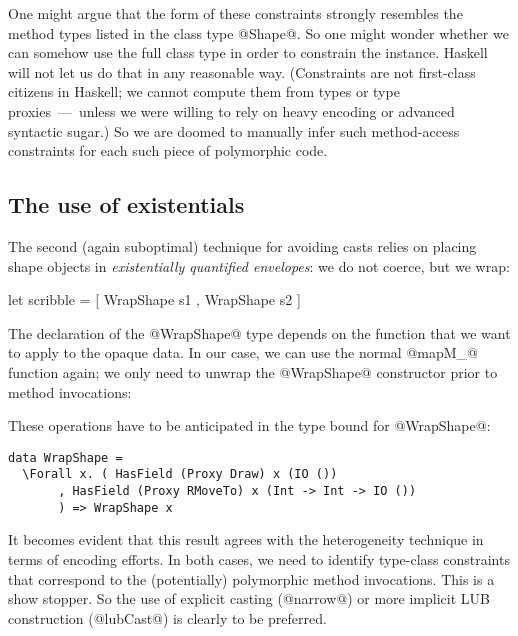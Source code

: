 One might argue that the form of these constraints strongly resembles
the method types listed in the class type @Shape@. So one might wonder
whether we can somehow use the full class type in order to constrain
the instance.  Haskell will not let us do that in any reasonable
way. (Constraints are not first-class citizens in Haskell; we cannot
compute them from types or type proxies~---~unless we were willing to
rely on heavy encoding or advanced syntactic sugar.) So we are doomed
to manually infer such method-access constraints for each such piece
of polymorphic code.






\medskip

\subsection{The use of existentials}
\label{S:ex}

The second (again suboptimal) technique for avoiding casts relies on
placing shape objects in \emph{existentially quantified envelopes}: we
do not coerce, but we wrap:

\begin{code}
 let scribble = [ WrapShape s1 , WrapShape s2 ]
\end{code}

\noindent
The declaration of the @WrapShape@ type depends on the function that
we want to apply to the opaque data. In our case, we can use the
normal @mapM_@ function again; we only need to unwrap the @WrapShape@
constructor prior to method invocations:


\noindent
These operations have to be anticipated in the type bound for
@WrapShape@:

\begin{Verbatim}[fontsize=\small,commandchars=\\\{\}]
 data WrapShape =
  \Forall x. ( HasField (Proxy Draw) x (IO ())
       , HasField (Proxy RMoveTo) x (Int -> Int -> IO ())
       ) => WrapShape x
\end{Verbatim}

\noindent
It becomes evident that this result agrees with the heterogeneity
technique in terms of encoding efforts. In both cases, we need to
identify type-class constraints that correspond to the (potentially)
polymorphic method invocations. This is a show stopper. So the use of
explicit casting (@narrow@) or more implicit LUB construction
(@lubCast@) is clearly to be preferred.
